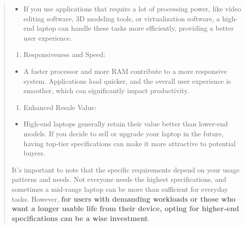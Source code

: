 \begin{leftbar}
\begin{quote}
 \begin{itemize}
 
 \item
 If you use applications that require a lot of processing power, like video editing software, 3D modeling tools, or virtualization software, a high-end laptop can handle these tasks more efficiently, providing a better user experience.
 \end{itemize}
 
 \begin{enumerate}[leftmargin=*]
 \def\labelenumi{\arabic{enumi}.}
 \setcounter{enumi}{6}
 
 \item
 Responsiveness and Speed:
 \end{enumerate}
 
 \begin{itemize}
 
 \item
 A faster processor and more RAM contribute to a more responsive system. Applications load quicker, and the overall user experience is smoother, which can significantly impact productivity.
 \end{itemize}
 
 \begin{enumerate}[leftmargin=*]
 \def\labelenumi{\arabic{enumi}.}
 \setcounter{enumi}{7}
 
 \item
 Enhanced Resale Value:
 \end{enumerate}
 
 \begin{itemize}
 
 \item
 High-end laptops generally retain their value better than lower-end models. If you decide to sell or upgrade your laptop in the future, having top-tier specifications can make it more attractive to potential buyers.
 \end{itemize}
 
 It's important to note that the specific requirements depend on your usage patterns and needs. Not everyone needs the highest specifications, and sometimes a mid-range laptop can be more than sufficient for everyday tasks. However, \textbf{for users with demanding workloads or those who want a longer usable life from their device, opting for higher-end specifications can be a wise investment}.
 \end{quote}\end{leftbar}
 
